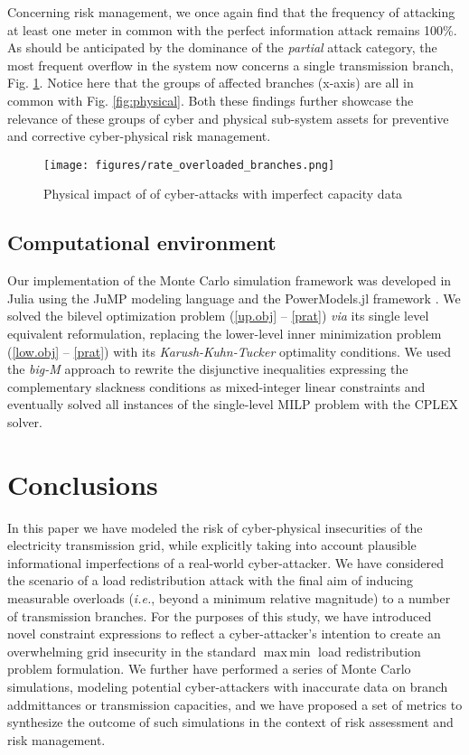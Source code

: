 \documentclass{IEEEtran4PSCC}
\DeclareMathOperator*{\maxmin}{max\,min}
\begin{document}
Concerning risk management, we once again find that the frequency of attacking at least one meter in common with the perfect information attack remains 100\%. As should be anticipated by the dominance of the \emph{partial} attack category, the most frequent overflow in the system now concerns a single transmission branch, Fig. \ref{fig:physical_rates}. Notice here that the groups of affected branches (x-axis) are all in common with Fig. \ref{fig:physical}.  Both these findings further showcase the relevance of these groups of cyber and physical  sub-system assets for preventive and corrective cyber-physical risk management. 
\begin{figure}[h]
\centering
\texttt{[image: figures/rate\_overloaded\_branches.png]}
\caption{Physical impact of of cyber-attacks with imperfect capacity data}
\label{fig:physical_rates}
\end{figure}



\subsection{Computational environment}


Our implementation of the Monte Carlo simulation framework was developed in Julia \cite{julia} using the JuMP modeling language \cite{jump} and the PowerModels.jl framework \cite{PowerModels}. We solved  {the} bilevel optimization problem  (\ref{up.obj} -- \ref{prat}) \textit{via} its single level  equivalent reformulation, replacing the lower-level inner minimization problem (\ref{low.obj} -- \ref{prat}) with its \emph{Karush-Kuhn-Tucker} optimality conditions.   We used the \emph{big-M} approach to rewrite the disjunctive inequalities expressing the complementary slackness conditions as mixed-integer linear constraints and eventually solved all instances of the single-level MILP problem with the CPLEX \cite{cplex} solver.

\section{Conclusions}
\label{theend}

In this paper we  {have} modeled the  {risk of cyber-physical insecurities} of the electricity transmission grid,  {while explicitly taking into account plausible informational imperfections of a real-world cyber-attacker}. We   {have} considered the scenario of a load redistribution attack with the final aim of inducing measurable overloads (\textit{i.e.}, beyond a minimum relative magnitude) to a number of transmission branches. For the purposes of this study, we have introduced novel constraint expressions to reflect a cyber-attacker's intention to create an overwhelming grid insecurity in the standard $\maxmin$ load redistribution problem formulation. We further   {have} performed a series of Monte Carlo simulations, modeling potential cyber-attackers with inaccurate data on branch addmittances or transmission capacities, and   {we have} proposed a set of metrics to synthesize the outcome of such simulations in the context of risk assessment and risk management. 
\end{document}
